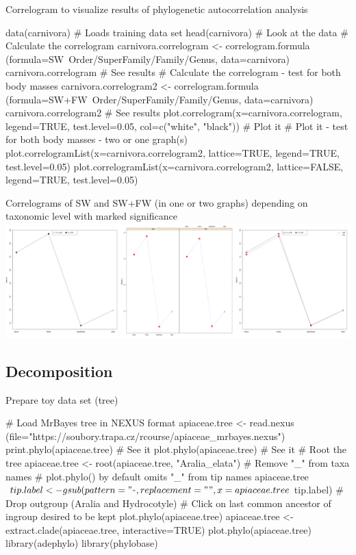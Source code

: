 \documentclass[compress, ucs, xelatex, 11pt, xcolor=svgnames,
  hyperref={
    bookmarks=true,
    unicode=true,
    colorlinks=true,
    pdftitle={Molecular data in R},
    plainpages=false,
    pdfauthor={Vojtech Zeisek},
    pdfsubject={Course about phylogeny and evolution in R},
    pdfcreator={XeLaTeX},
    pdfkeywords={R, evolution, phylogeny, molecular data},
    linkcolor=Tomato,
    anchorcolor=SaddleBrown,
    citecolor=Goldenrod,
    filecolor=DarkMagenta,
    menucolor=Sienna,
    urlcolor=DarkTurquoise,
    pdftex},
  url={hyphens, lowtilde} %
  ]{beamer}
\begin{document}
\begin{frame}[fragile]{Correlogram to visualize results of phylogenetic autocorrelation analysis}
  \begin{spluscode}
    data(carnivora) # Loads training data set
    head(carnivora) # Look at the data
    # Calculate the correlogram
    carnivora.correlogram <- correlogram.formula
      (formula=SW~Order/SuperFamily/Family/Genus, data=carnivora)
    carnivora.correlogram # See results
    # Calculate the correlogram - test for both body masses
    carnivora.correlogram2 <- correlogram.formula
      (formula=SW+FW~Order/SuperFamily/Family/Genus, data=carnivora)
    carnivora.correlogram2 # See results
    plot.correlogram(x=carnivora.correlogram, legend=TRUE,
      test.level=0.05, col=c("white", "black")) # Plot it
    # Plot it - test for both body masses - two or one graph(s)
    plot.correlogramList(x=carnivora.correlogram2, lattice=TRUE,
      legend=TRUE, test.level=0.05)
    plot.correlogramList(x=carnivora.correlogram2, lattice=FALSE,
      legend=TRUE, test.level=0.05)
  \end{spluscode}
\end{frame}

\begin{frame}{Correlograms of SW and SW+FW (in one or two graphs) depending on taxonomic level with marked significance}
  \includegraphics[width=\textwidth]{correlog.png}
\end{frame}

\subsection{Decomposition}

\begin{frame}[fragile]{Prepare toy data set (tree)}
  \begin{spluscode}
    # Load MrBayes tree in NEXUS format
    apiaceae.tree <- read.nexus
      (file="https://soubory.trapa.cz/rcourse/apiaceae_mrbayes.nexus")
    print.phylo(apiaceae.tree) # See it
    plot.phylo(apiaceae.tree) # See it
    # Root the tree
    apiaceae.tree <- root(apiaceae.tree, "Aralia_elata")
    # Remove "_" from taxa names
    # plot.phylo() by default omits "_" from tip names
    apiaceae.tree$tip.label <- gsub(pattern="_", replacement=" ",
      x=apiaceae.tree$tip.label)
    # Drop outgroup (Aralia and Hydrocotyle)
    # Click on last common ancestor of ingroup desired to be kept
    plot.phylo(apiaceae.tree)
    apiaceae.tree <- extract.clade(apiaceae.tree, interactive=TRUE)
    plot.phylo(apiaceae.tree)
    library(adephylo)
    library(phylobase)
  \end{spluscode}
\end{frame}
\end{document}
